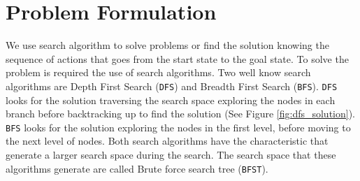 \section{Problem Formulation}
\noindent
We use search algorithm to solve problems or find the solution knowing the sequence of actions that goes from the start state to the goal state. To solve the problem is required the use of search algorithms. Two well know search algorithms are Depth First Search (\texttt{DFS}) and Breadth First Search (\texttt{BFS}). \texttt{DFS} looks for the solution traversing the search space exploring the nodes in each branch before backtracking up to find the solution (See Figure \ref{fig:dfs_solution}). \texttt{BFS} looks for the solution exploring the nodes in the first level, before moving to the next level of nodes. Both search algorithms have the characteristic that generate a larger search space during the search. The search space that these algorithms generate are called Brute force search tree (\texttt{BFST}).\\


